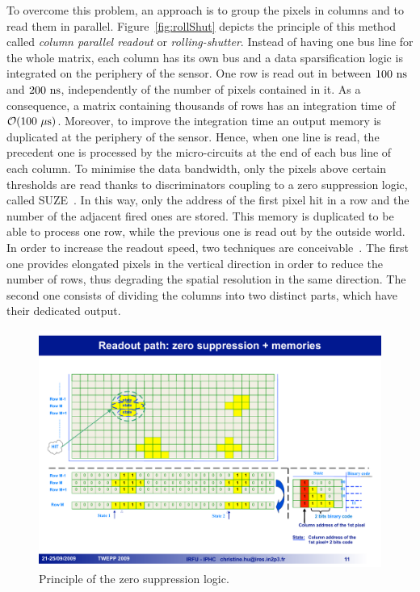     To overcome this problem, an approach is to group the pixels in columns and to read them in parallel.
    Figure~\ref{fig:rollShut} depicts the principle of this method called \textit{column parallel readout} or \textit{rolling-shutter}.
    Instead of having one bus line for the whole matrix, each column has its own bus and a data sparsification logic is integrated on the periphery of the sensor.
    One row is read out in between $100~\rm{ns}$ and $200~\rm{ns}$, independently of the number of pixels contained in it.
    As a consequence, a matrix containing thousands of rows has an integration time of $\mathcal{O}(100~\rm{\mu s})$.
    Moreover, to improve the integration time an output memory is duplicated at the periphery of the sensor.
    Hence, when one line is read, the precedent one is processed by the micro-circuits at the end of each bus line of each column.
    To minimise the data bandwidth, only the pixels above certain thresholds are read thanks to discriminators coupling to a zero suppression logic, called \gls{SUZE}~\cite{Himmi}.
    In this way, only the address of the first pixel hit in a row and the number of the adjacent fired ones are stored.
    This memory is duplicated to be able to process one row, while the previous one is read out by the outside world.
    In order to increase the readout speed, two techniques are conceivable~\cite{Winter:2009zz}.
    The first one provides elongated pixels in the vertical direction in order to reduce the number of rows, thus degrading the spatial resolution in the same direction.
    The second one consists of dividing the columns into two distinct parts, which have their dedicated output.

    \begin{figure}[!tbh]
      \centering
      \includegraphics[width=\textwidth]{Pictures/vxd/suze_hit.pdf}
      \caption{Principle of the zero suppression logic. }
      \label{fig:SUZE}
    \end{figure}

